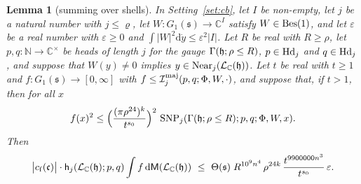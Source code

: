 \documentclass[11pt,a4paper]{article}
\newcommand{\m}[1]{\mbox{$#1$}}        %
\theoremstyle{plainx}
\newtheorem{lemma}[theorem]{Lemma}
\theoremstyle{uprightx}
\newcommand{\CC}{\mathbb{C}}
\newcommand{\NN}{\mathbb{N}}
\newcommand{\dd}{\mathrm{d}}
\newcommand{\cLC}[1]{\mathcal{L}_{\CC}(#1)}
\newcommand{\Gone}[1]{G_1(#1)}
\newcommand{\bandc}[1]{\Theta(#1)}
\begin{document}
\begin{lemma}[summing over shells]\label{l:shells}
In Setting~\ref{set:cb}, let $I$ be non-empty, let $j$ be a natural number with $j\le\varrho$, let
$W\colon\Gone{\mathfrak{s}}\to\CC^I$ satisfy \m{\IsBessel{W}{1}}, and let $\varepsilon$ be a real number with
$\varepsilon\ge0$ and $\int|W|^2\dd\dot y\le\varepsilon^2|I|$. Let $R$ be real with $R\ge\rho$, let
$p,q\colon\NN\to\CC^{\times}$ be heads of length $j$ for the gauge $\gauge{\mathfrak{h}}{\rho\le R}$,
\m{\IsHead{j}{p}} and \m{\IsHead{j}{q}}, and suppose that $W(y)\ne0$ implies
\m{\IsNear{\cLC{\mathfrak{h}}}{j}{y}}. Let $t$ be real with $t\ge1$ and $f\colon\Gone{\mathfrak{s}}\to[0,\infty]$
with $f\le\formMajorant{j}{p}{q}{\Phi}{W}{\cdot}$, and suppose that, if $t>1$, then for all $x$
\[f(x)^2\le\Bigl(\frac{(\pi\rho^{24})^{k}}{t^{s_0}}\Bigr)^{2}\,\selfNormProduct{j}{p}{q}{\Phi}{W}{x}{\gauge{\mathfrak{h}}{\rho\le R}}.\]
Then
\[\bigl|\formConst{\mathfrak{c}}\bigr|\cdot\headDensity{j}{p}{q}{\cLC{\mathfrak{h}}}\int f\,\dd\groupMeasure{\cLC{\mathfrak{h}}}
\ \le\ \bandc{\mathfrak{s}}\;R^{10^{9}n^{4}}\,\rho^{24k}\,\frac{t^{9900000n^{3}}}{t^{s_0}}\,\varepsilon.\]
\end{lemma}
\end{document}
